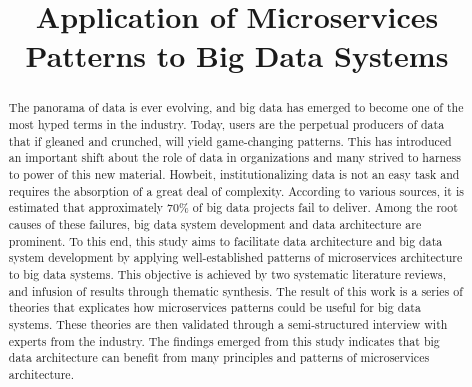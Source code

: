 \documentclass[conference]{IEEEtran}
\begin{document}
\title{Application of Microservices Patterns to Big Data Systems\\
}

\author{
\and
{}

}

\maketitle

\begin{abstract}

The panorama of data is ever evolving, and big data has emerged to become one of the most hyped terms in the industry. Today, users are the perpetual producers of data that if gleaned and crunched, will yield game-changing patterns. This has introduced an important shift about the role of data in organizations and many strived to harness to power of this new material. Howbeit, institutionalizing data is not an easy task and requires the absorption of a great deal of complexity. According to various sources, it is estimated that approximately 70\% of big data projects fail to deliver. Among the root causes of these failures, big data system development and data architecture are prominent. To this end, this study aims to facilitate data architecture and big data system development by applying well-established patterns of microservices architecture to big data systems. This objective is achieved by two systematic literature reviews, and infusion of results through thematic synthesis. The result of this work is a series of theories that explicates how microservices patterns could be useful for big data systems. These theories are then validated through a semi-structured interview with experts from the industry. The findings emerged from this study indicates that big data architecture can benefit from many principles and patterns of microservices architecture. 

\end{abstract}
\end{document}
